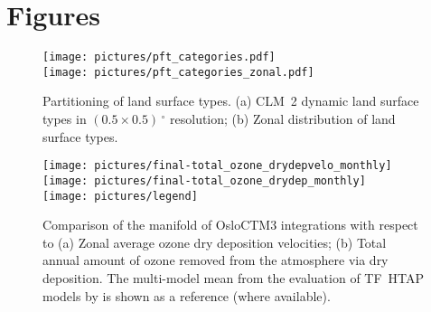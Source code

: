 \documentclass[gmd, manuscript]{copernicus}
\begin{document}








\clearpage

\appendix
\section{Figures}    %
\appendixfigures
\begin{figure*}[!htbp]
  \centering
  \texttt{[image: pictures/pft\_categories.pdf]}\\
  \texttt{[image: pictures/pft\_categories\_zonal.pdf]}
  \caption{Partitioning of land surface types. (a) CLM~2 dynamic land surface types in $(0.5\times0.5)\,\unit{^\circ}$ resolution; (b) Zonal distribution of land surface types.}
  \label{fig:pft_landsurface}
\end{figure*}

\appendixfigures
\begin{figure}[!htbp]
  \texttt{[image: pictures/final-total\_ozone\_drydepvelo\_monthly]}\\
  \texttt{[image: pictures/final-total\_ozone\_drydep\_monthly]}\\
  \texttt{[image: pictures/legend]}
  \caption{Comparison of the manifold of OsloCTM3 integrations with respect to (a) Zonal average ozone dry deposition velocities; (b) Total annual amount of ozone removed from the atmosphere via dry deposition. The multi-model mean from the evaluation of TF~HTAP models by \citet{ACP:Hardacre2015} is shown as a reference (where available).}
  \label{fig:mmm_drydep_season}
\end{figure}
\end{document}
